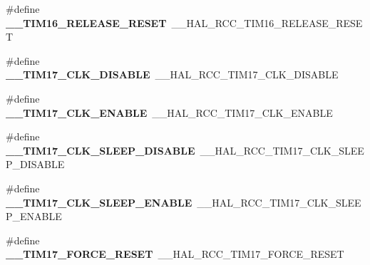 \begin{DoxyCompactItemize}
\item 
\hypertarget{group___h_a_l___r_c_c___aliased_gabc91257ee41523107cae6d7f3413750b}{\#define {\bfseries \-\_\-\-\_\-\-T\-I\-M16\-\_\-\-R\-E\-L\-E\-A\-S\-E\-\_\-\-R\-E\-S\-E\-T}~\-\_\-\-\_\-\-H\-A\-L\-\_\-\-R\-C\-C\-\_\-\-T\-I\-M16\-\_\-\-R\-E\-L\-E\-A\-S\-E\-\_\-\-R\-E\-S\-E\-T}\label{group___h_a_l___r_c_c___aliased_gabc91257ee41523107cae6d7f3413750b}

\item 
\hypertarget{group___h_a_l___r_c_c___aliased_ga221f536db3bd69c4a9617067509cc328}{\#define {\bfseries \-\_\-\-\_\-\-T\-I\-M17\-\_\-\-C\-L\-K\-\_\-\-D\-I\-S\-A\-B\-L\-E}~\-\_\-\-\_\-\-H\-A\-L\-\_\-\-R\-C\-C\-\_\-\-T\-I\-M17\-\_\-\-C\-L\-K\-\_\-\-D\-I\-S\-A\-B\-L\-E}\label{group___h_a_l___r_c_c___aliased_ga221f536db3bd69c4a9617067509cc328}

\item 
\hypertarget{group___h_a_l___r_c_c___aliased_ga0208b98e98d5baeb46f39c7ed5ae3351}{\#define {\bfseries \-\_\-\-\_\-\-T\-I\-M17\-\_\-\-C\-L\-K\-\_\-\-E\-N\-A\-B\-L\-E}~\-\_\-\-\_\-\-H\-A\-L\-\_\-\-R\-C\-C\-\_\-\-T\-I\-M17\-\_\-\-C\-L\-K\-\_\-\-E\-N\-A\-B\-L\-E}\label{group___h_a_l___r_c_c___aliased_ga0208b98e98d5baeb46f39c7ed5ae3351}

\item 
\hypertarget{group___h_a_l___r_c_c___aliased_gacad0cfe779960cb0b9444620e6ee7997}{\#define {\bfseries \-\_\-\-\_\-\-T\-I\-M17\-\_\-\-C\-L\-K\-\_\-\-S\-L\-E\-E\-P\-\_\-\-D\-I\-S\-A\-B\-L\-E}~\-\_\-\-\_\-\-H\-A\-L\-\_\-\-R\-C\-C\-\_\-\-T\-I\-M17\-\_\-\-C\-L\-K\-\_\-\-S\-L\-E\-E\-P\-\_\-\-D\-I\-S\-A\-B\-L\-E}\label{group___h_a_l___r_c_c___aliased_gacad0cfe779960cb0b9444620e6ee7997}

\item 
\hypertarget{group___h_a_l___r_c_c___aliased_ga7a2dbc1a3fd9cc044f437f3b3760138f}{\#define {\bfseries \-\_\-\-\_\-\-T\-I\-M17\-\_\-\-C\-L\-K\-\_\-\-S\-L\-E\-E\-P\-\_\-\-E\-N\-A\-B\-L\-E}~\-\_\-\-\_\-\-H\-A\-L\-\_\-\-R\-C\-C\-\_\-\-T\-I\-M17\-\_\-\-C\-L\-K\-\_\-\-S\-L\-E\-E\-P\-\_\-\-E\-N\-A\-B\-L\-E}\label{group___h_a_l___r_c_c___aliased_ga7a2dbc1a3fd9cc044f437f3b3760138f}

\item 
\hypertarget{group___h_a_l___r_c_c___aliased_ga86bf9b6f86bc9071e215bc664c8e0923}{\#define {\bfseries \-\_\-\-\_\-\-T\-I\-M17\-\_\-\-F\-O\-R\-C\-E\-\_\-\-R\-E\-S\-E\-T}~\-\_\-\-\_\-\-H\-A\-L\-\_\-\-R\-C\-C\-\_\-\-T\-I\-M17\-\_\-\-F\-O\-R\-C\-E\-\_\-\-R\-E\-S\-E\-T}\label{group___h_a_l___r_c_c___aliased_ga86bf9b6f86bc9071e215bc664c8e0923}


\end{DoxyCompactItemize}
